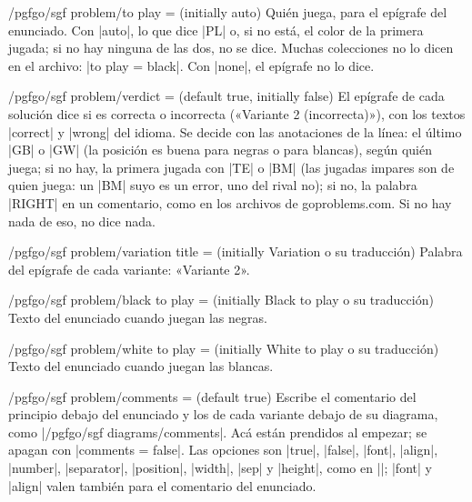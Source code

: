 \begin{key}{/pgfgo/sgf problem/to play =  (initially auto)}
	Quién juega, para el epígrafe del enunciado. Con |auto|, lo que dice |PL| o, si no está, el color de la primera jugada; si no hay ninguna de las dos, no se dice. Muchas colecciones no lo dicen en el archivo: |to play = black|. Con |none|, el epígrafe no lo dice.
\end{key}

\begin{key}{/pgfgo/sgf problem/verdict =  (default true, initially false)}
	El epígrafe de cada solución dice si es correcta o incorrecta («Variante 2 (incorrecta)»), con los textos |correct| y |wrong| del idioma. Se decide con las anotaciones de la línea: el último |GB| o |GW| (la posición es buena para negras o para blancas), según quién juega; si no hay, la primera jugada con |TE| o |BM| (las jugadas impares son de quien juega: un |BM| suyo es un error, uno del rival no); si no, la palabra |RIGHT| en un comentario, como en los archivos de goproblems.com. Si no hay nada de eso, no dice nada.

	\begin{codeexample}[]
	\end{codeexample}
\end{key}

\begin{key}{/pgfgo/sgf problem/variation title =  (initially Variation o su traducción)}
	Palabra del epígrafe de cada variante: «Variante 2».
\end{key}

\begin{key}{/pgfgo/sgf problem/black to play =  (initially Black to play o su traducción)}
	Texto del enunciado cuando juegan las negras.
\end{key}

\begin{key}{/pgfgo/sgf problem/white to play =  (initially White to play o su traducción)}
	Texto del enunciado cuando juegan las blancas.
\end{key}

\begin{key}{/pgfgo/sgf problem/comments =  (default true)}
	Escribe el comentario del principio debajo del enunciado y los de cada variante debajo de su diagrama, como |/pgfgo/sgf diagrams/comments|. Acá están prendidos al empezar; se apagan con |comments = false|. Las opciones son |true|, |false|, |font|, |align|, |number|, |separator|, |position|, |width|, |sep| y |height|, como en |\sgfdiagrams|; |font| y |align| valen también para el comentario del enunciado.
\end{key}


